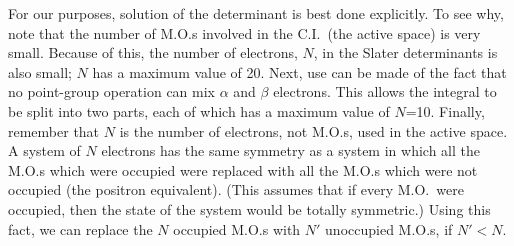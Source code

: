 For our purposes, solution of the determinant is best done explicitly. To see
why, note that the number of M.O.s involved in the C.I.\ (the active space) is
very small.  Because of this, the number of electrons, $N$, in the Slater
determinants is also small; $N$ has a maximum value of  20.  Next, use can be
made of the fact that no point-group operation can mix $\alpha$ and $\beta$
electrons.  This allows the integral to be split into two parts, each of which
has a maximum value  of $N$=10. Finally, remember that $N$ is the number of
electrons, not M.O.s, used in the active space.  A system of $N$ electrons has
the same symmetry as a system in which all the M.O.s which were occupied were
replaced with all the M.O.s which were not occupied (the positron
equivalent). (This assumes that if every M.O.\ were
occupied, then the state of the system would be totally symmetric.)   Using
this fact, we can replace the $N$ occupied M.O.s with $N'$ unoccupied M.O.s, if
$N' < N$.

